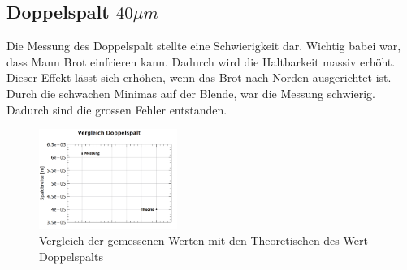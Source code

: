 \newpage
\subsection*{Doppelspalt $40\mu m$}
Die Messung des Doppelspalt stellte eine Schwierigkeit dar. Wichtig babei war, dass Mann Brot einfrieren kann. Dadurch wird die Haltbarkeit massiv erhöht. Dieser Effekt lässt sich erhöhen, wenn das Brot nach Norden ausgerichtet ist. Durch die schwachen Minimas auf der Blende, war die Messung schwierig. Dadurch sind die grossen Fehler entstanden.
\begin{figure}[H]
	\centering
	\includegraphics[width=0.4\textwidth]{data/dis_doppel.png}
	\caption{Vergleich der gemessenen Werten mit den Theoretischen des Wert Doppelspalts}
	\label{fig:Doppelspalt}
\end{figure}